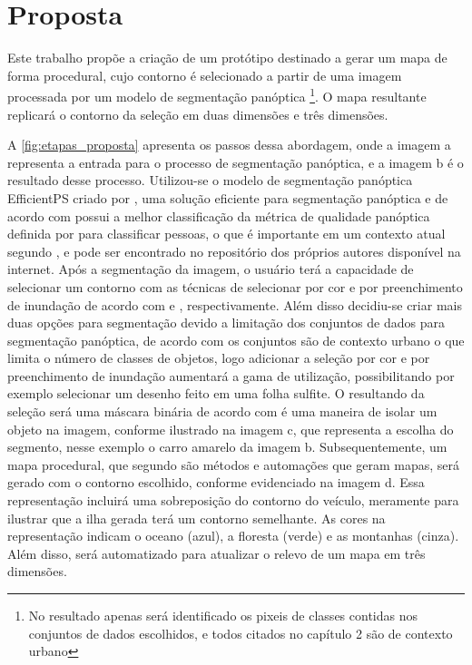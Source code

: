 \section{Proposta}

Este trabalho propõe a criação de um protótipo destinado a gerar um mapa de forma procedural, cujo contorno é selecionado a partir de uma imagem processada por um modelo de segmentação panóptica \footnote{No resultado apenas será identificado os pixeis de classes contidas nos conjuntos de dados escolhidos, e todos citados no capítulo 2 são de contexto urbano}. O mapa resultante replicará o contorno da seleção em duas dimensões e três dimensões.

A \cref{fig:etapas_proposta} apresenta os passos dessa abordagem, onde a imagem a representa a entrada para o processo de segmentação panóptica, e a imagem b é o resultado desse processo. Utilizou-se o modelo de segmentação panóptica EfficientPS criado por , uma solução eficiente para segmentação panóptica e de acordo com  possui a melhor classificação da métrica de qualidade panóptica definida por  para classificar pessoas, o que é importante em um contexto atual segundo , e pode ser encontrado no repositório dos próprios autores  disponível na internet. Após a segmentação da imagem, o usuário terá a capacidade de selecionar um contorno com as técnicas de selecionar por cor e por preenchimento de inundação de acordo com  e , respectivamente. Além disso decidiu-se criar mais duas opções para segmentação devido a limitação dos conjuntos de dados para segmentação panóptica, de acordo com  os conjuntos são de contexto urbano o que limita o número de classes de objetos, logo adicionar a seleção por cor e por preenchimento de inundação aumentará a gama de utilização, possibilitando por exemplo selecionar um desenho feito em uma folha sulfite.
O resultando da seleção será uma máscara binária de acordo com  é uma maneira de isolar um objeto na imagem, conforme ilustrado na imagem c, que representa a escolha do segmento, nesse exemplo o carro amarelo da imagem b. Subsequentemente, um mapa procedural, que segundo  são métodos e automações que geram mapas, será gerado com o contorno escolhido, conforme evidenciado na imagem d. Essa representação incluirá uma sobreposição do contorno do veículo, meramente para ilustrar que a ilha gerada terá um contorno semelhante. As cores na representação indicam o oceano (azul), a floresta (verde) e as montanhas (cinza). Além disso, será automatizado para atualizar o relevo de um mapa em três dimensões.

